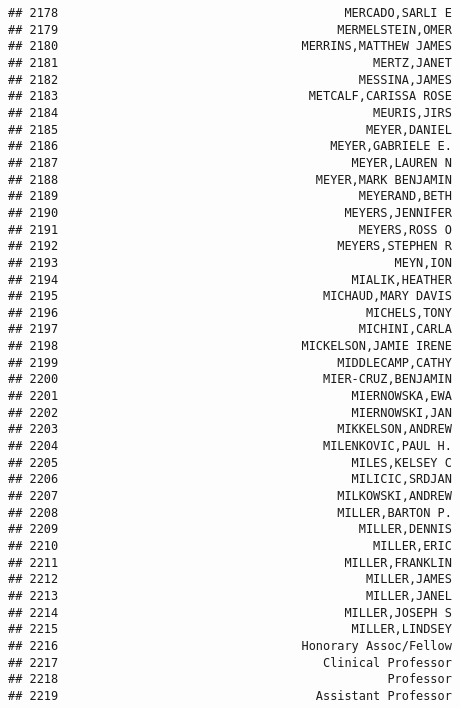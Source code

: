 \documentclass[
]{article}
\begin{document}
\begin{verbatim}
## 2178                                        MERCADO,SARLI E
## 2179                                       MERMELSTEIN,OMER
## 2180                                  MERRINS,MATTHEW JAMES
## 2181                                            MERTZ,JANET
## 2182                                          MESSINA,JAMES
## 2183                                   METCALF,CARISSA ROSE
## 2184                                            MEURIS,JIRS
## 2185                                           MEYER,DANIEL
## 2186                                      MEYER,GABRIELE E.
## 2187                                         MEYER,LAUREN N
## 2188                                    MEYER,MARK BENJAMIN
## 2189                                          MEYERAND,BETH
## 2190                                        MEYERS,JENNIFER
## 2191                                          MEYERS,ROSS O
## 2192                                       MEYERS,STEPHEN R
## 2193                                               MEYN,ION
## 2194                                         MIALIK,HEATHER
## 2195                                     MICHAUD,MARY DAVIS
## 2196                                           MICHELS,TONY
## 2197                                          MICHINI,CARLA
## 2198                                  MICKELSON,JAMIE IRENE
## 2199                                       MIDDLECAMP,CATHY
## 2200                                     MIER-CRUZ,BENJAMIN
## 2201                                         MIERNOWSKA,EWA
## 2202                                         MIERNOWSKI,JAN
## 2203                                       MIKKELSON,ANDREW
## 2204                                     MILENKOVIC,PAUL H.
## 2205                                         MILES,KELSEY C
## 2206                                         MILICIC,SRDJAN
## 2207                                       MILKOWSKI,ANDREW
## 2208                                       MILLER,BARTON P.
## 2209                                          MILLER,DENNIS
## 2210                                            MILLER,ERIC
## 2211                                        MILLER,FRANKLIN
## 2212                                           MILLER,JAMES
## 2213                                           MILLER,JANEL
## 2214                                        MILLER,JOSEPH S
## 2215                                         MILLER,LINDSEY
## 2216                                  Honorary Assoc/Fellow
## 2217                                     Clinical Professor
## 2218                                              Professor
## 2219                                    Assistant Professor

\end{verbatim}
\end{document}
